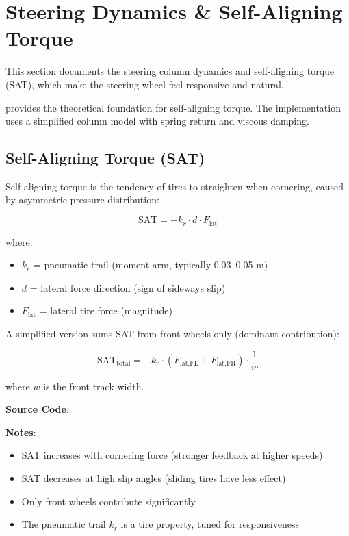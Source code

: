 \section{Steering Dynamics \& Self-Aligning Torque}

\label{sec:steering-sat}

This section documents the steering column dynamics and self-aligning torque (SAT), which make the steering wheel feel responsive and natural.

\cite{pacejka2005tire} provides the theoretical foundation for self-aligning torque. The implementation uses a simplified column model with spring return and viscous damping.

\subsection{Self-Aligning Torque (SAT)}

Self-aligning torque is the tendency of tires to straighten when cornering, caused by asymmetric pressure distribution:

\begin{equation}
  \text{SAT} = -k_r \cdot d \cdot F_{\text{lat}}
  \label{eq:sat-magnitude}
\end{equation}

where:
\begin{itemize}
  \item $k_r$ = pneumatic trail (moment arm, typically 0.03–0.05 m)
  \item $d$ = lateral force direction (sign of sideways slip)
  \item $F_{\text{lat}}$ = lateral tire force (magnitude)
\end{itemize}

A simplified version sums SAT from front wheels only (dominant contribution):

\begin{equation}
  \text{SAT}_{\text{total}} = -k_r \cdot (F_{\text{lat,FL}} + F_{\text{lat,FR}}) \cdot \frac{1}{w}
  \label{eq:sat-total}
\end{equation}

where $w$ is the front track width.

\textbf{Source Code}: 

\textbf{Notes}:
\begin{itemize}
  \item SAT increases with cornering force (stronger feedback at higher speeds)
  \item SAT decreases at high slip angles (sliding tires have less effect)
  \item Only front wheels contribute significantly
  \item The pneumatic trail $k_r$ is a tire property, tuned for responsiveness
\end{itemize}

